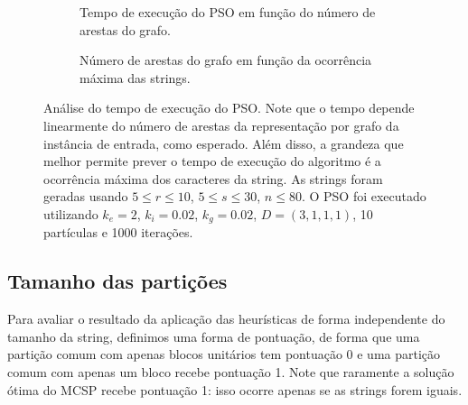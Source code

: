         \begin{figure}[htb]
            \centering
            \begin{subfigure}[b]{0.49\textwidth}
                \centering

                \caption{Tempo de execução do PSO em função do número de arestas do grafo.}
                \label{fig:tempo-pso-vs-arestas}
            \end{subfigure}%
            \hfill%
            \begin{subfigure}[b]{0.49\textwidth}
                \centering

                \caption{Número de arestas do grafo em função da ocorrência máxima das strings.}
                \label{fig:tempo-pso-arestas-vs-occ}
            \end{subfigure}

            \caption{Análise do tempo de execução do PSO. Note que o tempo depende linearmente do número de arestas da representação por grafo da instância de entrada, como esperado. Além disso, a grandeza que melhor permite prever o tempo de execução do algoritmo é a ocorrência máxima dos caracteres da string. As strings foram geradas usando $5 \leq r \leq 10$, $5 \leq s \leq 30$, $n \leq 80$. O PSO foi executado utilizando $k_e = 2$, $k_i = 0.02$, $k_g = 0.02$, $D = (3, 1, 1, 1)$, 10 partículas e 1000 iterações.}
            \label{fig:tempo-pso}
        \end{figure}

\subsection{Tamanho das partições} \label{sec:resultados-tamanho}

    Para avaliar o resultado da aplicação das heurísticas de forma independente do tamanho da string, definimos uma forma de pontuação, de forma que uma partição comum com apenas blocos unitários tem pontuação 0 e uma partição comum com apenas um bloco recebe pontuação 1. Note que raramente a solução ótima do MCSP recebe pontuação 1: isso ocorre apenas se as strings forem iguais.

